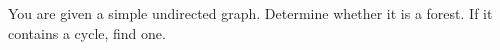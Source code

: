 You are given a simple undirected graph. Determine whether it is a forest. If it contains a cycle, find one.
